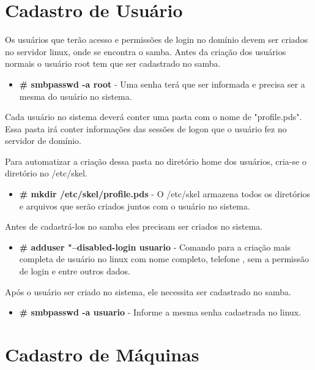 \section{Cadastro de Usuário}

Os usuários que terão acesso e permissões de login no domínio devem ser criados no servidor linux, onde se encontra o samba. Antes da criação dos usuários normais o usuário root tem que ser cadastrado no samba.

\begin{itemize}
	\item \textbf {\# smbpasswd -a root} - Uma senha terá que ser informada e precisa ser a mesma do usuário no sistema.
\end{itemize}

Cada usuário no sistema deverá conter uma pasta com o nome de "profile.pds". Essa pasta irá conter informações das sessões de logon que o usuário fez no servidor de domínio.

Para automatizar a criação dessa pasta no diretório home dos usuários, cria-se o diretório no /etc/skel.

\begin{itemize}
	\item \textbf{\# mkdir /etc/skel/profile.pds} - O /etc/skel armazena todos os diretórios e arquivos que serão criados juntos com o usuário no sistema.
\end{itemize}

Antes de cadastrá-los no samba eles precisam ser criados no sistema.

\begin{itemize}
	\item \textbf{\# adduser "--disabled-login usuario} - Comando para a criação mais completa de usuário no linux com nome completo, telefone , sem a permissão de login e entre outros dados.
\end{itemize}

Após o usuário ser criado no sistema, ele necessita ser cadastrado no samba.

\begin{itemize}
	\item \textbf{\# smbpasswd -a usuario} - Informe a mesma senha cadastrada no linux.
\end{itemize}

\section{Cadastro de Máquinas}

